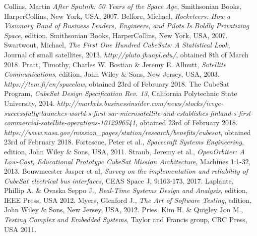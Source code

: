 \documentclass[english,12pt,a4paper,pdftex,elec,utf8]{aaltothesis}
\begin{document}
{}
\begin{thebibliography}{99}

 Collins, Martin
  \textit{After Sputnik: 50 Years of the Space Age}, Smithsonian Books, HarperCollins, New York, USA, 2007.
 Belfore, Michael,
  \textit{Rocketeers: How a Visionary Band of Business Leaders, Engineers, and Pilots Is Boldly Privatizing Space},  edition, Smithsonian Books, HarperCollins, New York, USA, 2007.
 Swartwout, Michael,
  \textit{The First One Hundred CubeSats: A Statistical Look}, Journal of small satellites, 2013. 
  \textit{http://pluto.jhuapl.edu/}, obtained 8th of March 2018. 
 Pratt, Timothy, Charles W. Bostian \& Jeremy E. Allnutt,
  \textit{Satellite Communications},  edition, John Wiley \& Sons, New Jersey, USA, 2003.
  \textit{https://tem.fi/en/spacelaw}, obtained 23rd of February 2018.
 The CubeSat Program,
  \textit{CubeSat Design Specification Rev. 13}, California Polytechnic State University, 2014.
  \textit{http://markets.businessinsider.com/news/stocks/iceye-successfully-launches-world-s-first-sar-microsatellite-and-establishes-finland-s-first-commercial-satellite-operations-1012996541}, obtained 23rd of February 2018.
  \textit{https://www.nasa.gov/mission\_pages/station/research/benefits/cubesat}, obtained 23rd of February 2018.
 Fortescue, Peter et al.,
  \textit{Spacecraft Systems Engineering},  edition, John Wiley \& Sons, USA, 2011.
 Straub, Jeremy et al.,
  \textit{OpenOrbiter: A Low-Cost, Educational Prototype CubeSat Mission Architecture}, Machines 1:1-32, 2013.
 Bouwmeester Jasper et al,
  \textit{Survey on the implementation and reliability of CubeSat electrical bus interfaces}, CEAS Space J, 9:163-173, 2017.
 Laplante, Phillip A. \& Ovaska Seppo J.,
  \textit{Real-Time Systems Design and Analysis},  edition, IEEE Press, USA 2012.
 Myers, Glenford J.,
  \textit{The Art of Software Testing},  edition, John Wiley \& Sons, New Jersey, USA, 2012.
 Pries, Kim H. \& Quigley Jon M.,
  \textit{Testing Complex and Embedded Systems}, Taylor and Francis group, CRC Press, USA 2011.

\end{thebibliography}
\end{document}
